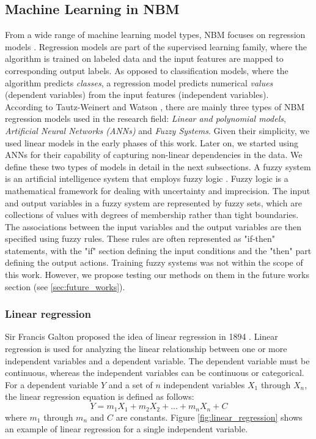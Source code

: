 \subsection{Machine Learning in NBM}
  From a wide range of machine learning model types, NBM focuses on regression models \cite{Regression}. Regression models are part of the supervised learning family, 
  where the algorithm is trained on labeled data and the input features are mapped to corresponding output labels. 
  As opposed to classification models, where the algorithm predicts \emph{classes}, a regression model predicts numerical \emph{values} (dependent variables) from the input 
  features (independent variables).\\
  According to Tautz-Weinert and Watson \cite{SCADA_NBM_Review}, there are mainly three types of NBM regression models used in the research field: \emph{Linear and polynomial models},
  \emph{Artificial Neural Networks (ANNs)} and \emph{Fuzzy Systems}. Given their simplicity, we used linear models in the early phases of this work. Later on, we started using 
  ANNs for their capability of capturing non-linear dependencies in the data. We define these two types of models in detail in the next subsections.
  A fuzzy system \cite{Neuro_fuzzy} is an artificial intelligence system that employs fuzzy logic \cite{fuzzy_sets}. Fuzzy logic is a mathematical framework for 
  dealing with uncertainty and imprecision.
  The input and output variables in a fuzzy system are represented by fuzzy sets, which are collections of values with degrees of membership rather than tight boundaries. 
  The associations between the input variables and the output variables are then specified using fuzzy rules. 
  These rules are often represented as "if-then" statements, with the "if" section defining the input conditions and the "then" part defining the output actions.
  Training fuzzy systems was not within the scope of this work. However, we propose testing our methods on them in the future works section (see \ref{sec:future_works}).

  \subsubsection{Linear regression}
    Sir Francis Galton proposed the idea of linear regression in 1894 \cite{Natural_Inheritance}.
    Linear regression is used for analyzing the linear relationship between one or more independent variables and a dependent variable.
    The dependent variable must be continuous, whereas the independent variables can be continuous or categorical. For a dependent variable $Y$ and a set of $n$ independent
    variables $X_1$ through $X_n$, the linear regression equation is defined as follows:
    \begin{equation}
      Y = m_1X_1 + m_2X_2 + ... + m_nX_n + C
    \end{equation}
    where $m_1$ through $m_n$ and $C$ are constants. Figure \ref{fig:linear_regression} shows an example of linear regression for a single independent variable.

